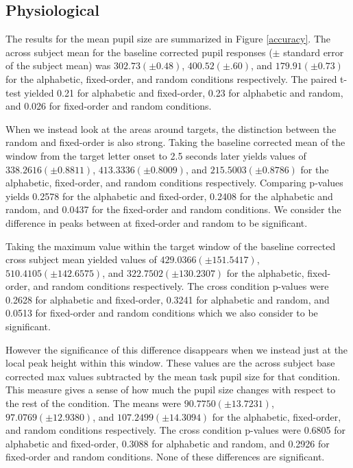 \documentclass[10pt]{article}
\begin{document}
\subsection{Physiological}

The results for the mean pupil size are summarized in Figure \ref{accuracy}.
The across subject mean for the baseline corrected pupil responses
($\pm$ standard error of the subject mean) was $ 302.73 (\pm
0.48)$,
$400.52 (\pm .60)$, and $179.91 (\pm 0.73)$ for the alphabetic,
fixed-order, and random conditions respectively.
The paired t-test
yielded 0.21 for alphabetic and fixed-order, 0.23 for alphabetic
and random, and 0.026 for fixed-order and random conditions.

When we instead look at the areas around targets, the distinction
between the random and fixed-order is also strong.  Taking
the baseline corrected mean of the window from the target letter
onset to 2.5 seconds later yields values of $338.2616 (\pm 0.8811)$,
$413.3336 (\pm 0.8009)$, and $215.5003 (\pm 0.8786)$ for the alphabetic,
fixed-order, and random conditions respectively.  Comparing p-values
yields 0.2578 for the alphabetic and fixed-order, 0.2408 for the
alphabetic and random, and 0.0437 for the fixed-order and random conditions.
We consider the difference in peaks between at fixed-order and
random to be significant.

Taking the maximum value within the target window of the baseline
corrected cross subject mean yielded  values of $429.0366 (\pm
151.5417)$, $510.4105 (\pm 142.6575)$, and $322.7502 (\pm 130.2307)$ for
the alphabetic, fixed-order, and random conditions respectively.
The cross condition p-values were 0.2628 for alphabetic and
fixed-order, 0.3241 for alphabetic and random, and 0.0513 for
fixed-order and random conditions which we also consider to be significant.

However the significance of this difference disappears when we
instead just at the local peak height within this window.  These
values are the across subject base corrected max values subtracted
by the mean task pupil size for that condition.  This measure gives
a sense of how much the pupil size changes with respect to the rest
of the condition. The means were $90.7750 (\pm 13.7231)$, $97.0769 (\pm
12.9380)$, and $107.2499 (\pm 14.3094)$ for the alphabetic,
fixed-order, and random conditions respectively.  The cross
condition p-values were 0.6805 for alphabetic and fixed-order,
0.3088 for alphabetic and random, and 0.2926 for fixed-order and
random conditions.  None of these differences are significant.
\end{document}

